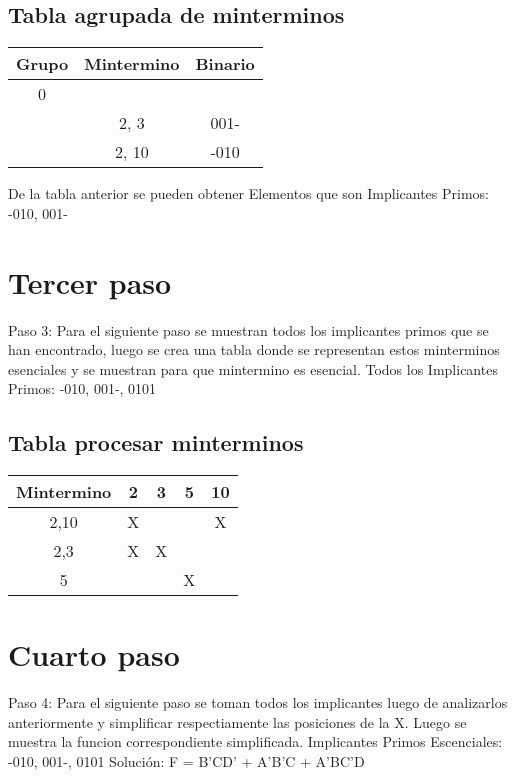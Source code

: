 \documentclass{beamer}%
\begin{document}
\subsection{Tabla agrupada de minterminos}%
\label{subsec:Tablaagrupadademinterminos}%
\begin{tabular}{| c | c | c |}%
\hline%
Grupo&Mintermino&Binario\\%
\hline%
0&&\\%
&2, 3&001{-}\\%
&2, 10&{-}010\\%
\hline%
\hline%
\end{tabular}%
\newline%
\newline%

%
De la tabla anterior se pueden obtener Elementos que son Implicantes Primos: {-}010, 001{-}

%
\newpage%
\section{Tercer paso}%
\label{sec:Tercerpaso}%
Paso 3:%
\newline%
Para el siguiente paso se muestran todos los implicantes primos que se han encontrado, luego se crea una tabla donde se representan estos minterminos esenciales y se muestran para que mintermino es esencial.\newline%
\newline%
%
Todos los Implicantes Primos: {-}010, 001{-}, 0101%
\newline%
\newline%
%
\subsection{Tabla procesar minterminos}%
\label{subsec:Tablaprocesarminterminos}%
\begin{tabular}{| c |c |c |c |c |}%
\hline%
Mintermino&2&3&5&10\\%
\hline%
2,10&X& & &X\\%
\hline%
2,3&X&X& & \\%
\hline%
5& & &X& \\%
\hline%
\end{tabular}%
\newline%
\newline%

%
\newpage%
\section{Cuarto paso}%
\label{sec:Cuartopaso}%
Paso 4:%
\newline%
Para el siguiente paso se toman todos los implicantes luego de analizarlos anteriormente y simplificar respectiamente las posiciones de la X. \newline%
Luego se muestra la funcion correspondiente simplificada. \newline%
\newline%
%
Implicantes Primos Escenciales: {-}010, 001{-}, 0101%
\newline%
%
Solución: F = B'CD' + A'B'C + A'BC'D

%
\end{document}
